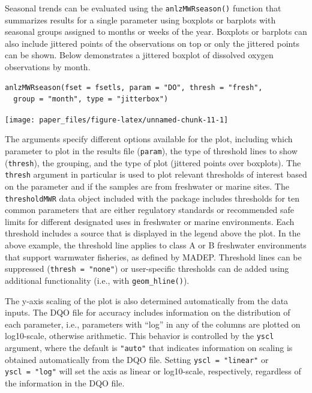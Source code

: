 Seasonal trends can be evaluated using the \texttt{anlzMWRseason()} function that summarizes results for a single parameter using boxplots or barplots with seasonal groups assigned to months or weeks of the year. Boxplots or barplots can also include jittered points of the observations on top or only the jittered points can be shown. Below demonstrates a jittered boxplot of dissolved oxygen observations by month.

\begin{verbatim}
anlzMWRseason(fset = fsetls, param = "DO", thresh = "fresh", 
  group = "month", type = "jitterbox")
\end{verbatim}

\begin{center}\texttt{[image: paper\_files/figure-latex/unnamed-chunk-11-1]} \end{center}

The arguments specify different options available for the plot, including which parameter to plot in the results file (\texttt{param}), the type of threshold lines to show (\texttt{thresh}), the grouping, and the type of plot (jittered points over boxplots). The \texttt{thresh} argument in particular is used to plot relevant thresholds of interest based on the parameter and if the samples are from freshwater or marine sites. The \texttt{thresholdMWR} data object included with the package includes thresholds for ten common parameters that are either regulatory standards or recommended safe limits for different designated uses in freshwater or marine environments. Each threshold includes a source that is displayed in the legend above the plot. In the above example, the threshold line applies to class A or B freshwater environments that support warmwater fisheries, as defined by MADEP. Threshold lines can be suppressed (\texttt{thresh\ =\ "none"}) or user-specific thresholds can de added using additional  functionality (i.e., with \texttt{geom\_hline()}).

The y-axis scaling of the plot is also determined automatically from the data inputs. The DQO file for accuracy includes information on the distribution of each parameter, i.e., parameters with ``log'' in any of the columns are plotted on log10-scale, otherwise arithmetic. This behavior is controlled by the \texttt{yscl} argument, where the default is \texttt{"auto"} that indicates information on scaling is obtained automatically from the DQO file. Setting \texttt{yscl\ =\ "linear"} or \texttt{yscl\ =\ "log"} will set the axis as linear or log10-scale, respectively, regardless of the information in the DQO file.

